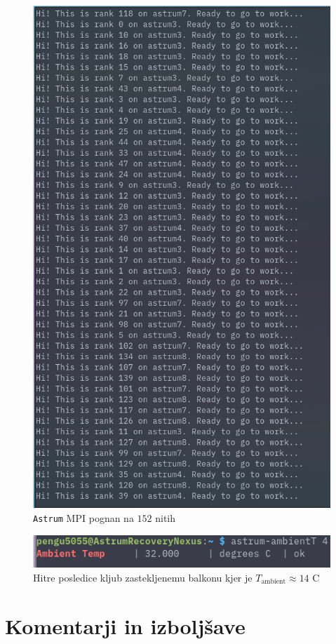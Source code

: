 \documentclass[a4paper]{article}
\begin{document}
\begin{figure}[H]
    \centering
    \includegraphics[height=0.45\textheight]{./ranks.png}
    \caption{\texttt{Astrum} MPI pognan na $152$ nitih}
    \label{fig:astrum-mpi}
\end{figure}

\begin{figure}
    \centering
    \includegraphics[height=0.05\textheight]{./temp.png}
    \caption{Hitre posledice kljub zastekljenemu balkonu kjer je $T_{\mathrm{ambient}} \approx 14$ \textdegree C}
    \label{fig:astrum-temp}
\end{figure}


\section{Komentarji in izboljšave}

\newpage


\end{document}
